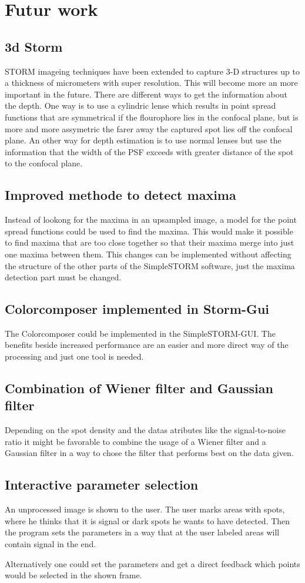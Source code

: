 \chapter{Futur work}
\section{3d Storm}
STORM imageing techniques have been extended to capture 3-D structures up to a thickness of micrometers with super resolution. This will become more an more important in the future. There are different ways to get the information about the depth. One way is to use a cylindric lense which results in point spread functions that are symmetrical if the flourophore lies in the confocal plane, but is more and more assymetric the farer away the captured spot lies off the confocal plane.\newline
An other way for depth estimation is to use normal lenses but use the information that the width of the PSF exceeds with greater distance of the spot to the confocal plane.
\section{Improved methode to detect maxima}
Instead of lookong for the maxima in an upsampled image, a model for the point spread functions could be used to find the maxima. This would make it possible to find maxima that are too close together so that their maxima merge into just one maxima between them.\newline
This changes can be implemented without affecting the structure of the other parts of the SimpleSTORM software, just the maxima detection part must be changed.
\section{Colorcomposer implemented in Storm-Gui}
The Colorcomposer could be implemented in the SimpleSTORM-GUI. The benefits beside increased performance are an easier and more direct way of the processing and just one tool is needed.
\section{Combination of Wiener filter and Gaussian filter}
Depending on the spot density and the datas atributes like the signal-to-noise ratio it might be favorable to combine the usage of a Wiener filter and a Gaussian filter in a way to chose the filter that performs best on the data given.
\section{Interactive parameter selection}
An unprocessed image is shown to the user. The user marks areas with spots, where he thinks that it is signal or dark spots he wants to have detected. Then the program sets the parameters in a way that at the user labeled areas will contain signal in the end.

Alternatively one could set the parameters and get a direct feedback which points would be selected in the shown frame.